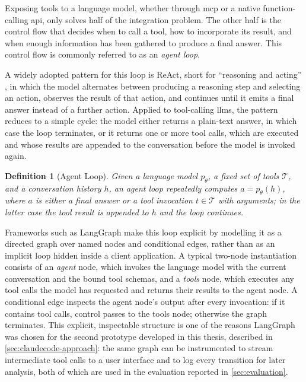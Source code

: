 \documentclass[
  numbers=noenddot,
  english,
  a4paper,
  twoside,
  bibliography=totoc,
  headsepline,
  cleardoublepage=empty,
  parskip=half,
  draft=false
]{scrbook}
\theoremstyle{break}
\newtheorem{definition}{Definition}[chapter]
\renewcommand{\_}{\textunderscore\allowbreak}
\begin{document}
Exposing tools to a language model, whether through \gls{mcp} or a native function-calling
\gls{api}, only solves half of the integration problem.
The other half is the control flow that decides when to call a tool, how to incorporate its
result, and when enough information has been gathered to produce a final answer.
This control flow is commonly referred to as an \emph{agent loop}.

A widely adopted pattern for this loop is ReAct, short for ``reasoning and acting''
\cite{yao2023react}, in which the model alternates between producing a reasoning step and
selecting an action, observes the result of that action, and continues until it emits a final
answer instead of a further action.
Applied to tool-calling \glspl{llm}, the pattern reduces to a simple cycle: the model either
returns a plain-text answer, in which case the loop terminates, or it returns one or more tool
calls, which are executed and whose results are appended to the conversation before the model
is invoked again.

\begin{definition}[Agent Loop]
  Given a language model $p_\theta$, a fixed set of tools $\mathcal{T}$, and a conversation
  history $h$, an agent loop repeatedly computes $a = p_\theta(h)$, where $a$ is either a final
  answer or a tool invocation $t \in \mathcal{T}$ with arguments; in the latter case the tool
  result is appended to $h$ and the loop continues.
\end{definition}

Frameworks such as LangGraph make this loop explicit by modelling it as a directed graph over
named nodes and conditional edges, rather than as an implicit loop hidden inside a client
application.
A typical two-node instantiation consists of an \emph{agent} node, which invokes the language
model with the current conversation and the bound tool schemas, and a \emph{tools} node, which
executes any tool calls the model has requested and returns their results to the agent node.
A conditional edge inspects the agent node's output after every invocation: if it contains tool
calls, control passes to the tools node; otherwise the graph terminates.
This explicit, inspectable structure is one of the reasons LangGraph was chosen for the second
prototype developed in this thesis, described in \cref{sec:claudecode-approach}: the same graph
can be instrumented to stream intermediate tool calls to a user interface and to log every
transition for later analysis, both of which are used in the evaluation reported in
\cref{sec:evaluation}.
\end{document}
